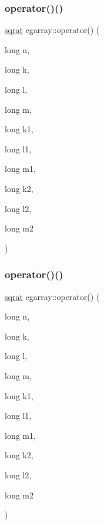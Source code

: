 \subsubsection{\texorpdfstring{operator()()}{operator()()}\hspace{0.1cm}{\footnotesize\ttfamily [1/2]}}
{\footnotesize\ttfamily \mbox{\hyperlink{classsqrat}{sqrat}} cgarray\+::operator() (\begin{DoxyParamCaption}\item[{long}]{n,  }\item[{long}]{k,  }\item[{long}]{l,  }\item[{long}]{m,  }\item[{long}]{k1,  }\item[{long}]{l1,  }\item[{long}]{m1,  }\item[{long}]{k2,  }\item[{long}]{l2,  }\item[{long}]{m2 }\end{DoxyParamCaption})}

\mbox{\label{classcgarray_ad55c1e537d3070a732d9355ed351d53e}} 
\subsubsection{\texorpdfstring{operator()()}{operator()()}\hspace{0.1cm}{\footnotesize\ttfamily [2/2]}}
{\footnotesize\ttfamily \mbox{\hyperlink{classsqrat}{sqrat}} cgarray\+::operator() (\begin{DoxyParamCaption}\item[{long}]{n,  }\item[{long}]{k,  }\item[{long}]{l,  }\item[{long}]{m,  }\item[{long}]{k1,  }\item[{long}]{l1,  }\item[{long}]{m1,  }\item[{long}]{k2,  }\item[{long}]{l2,  }\item[{long}]{m2 }\end{DoxyParamCaption})}

